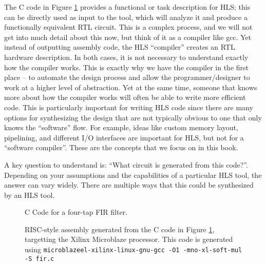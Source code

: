 The C code in Figure \ref{fig:FIR} provides a functional or task description for HLS; this can be directly used as input to the \VHLS tool, which will analyze it and  produce a functionally equivalent RTL circuit. This is a complex process, and we will not get into much detail about this now, but think of it as a compiler like gcc. Yet instead of outputting assembly code, the HLS ``compiler'' creates an RTL hardware description. In both cases, it is not necessary to understand exactly how the compiler works. This is exactly why we have the compiler in the first place -- to automate the design process and allow the programmer/designer to work at a higher level of abstraction. Yet at the same time, someone that knows more about how the compiler works will often be able to write more efficient code. This is particularly important for writing HLS code since there are many options for synthesizing the design that are not typically obvious to one that only knows the ``software'' flow. For example, ideas like custom memory layout, pipelining, and different I/O interfaces are important for HLS, but not for a ``software compiler''. These are the concepts that we focus on in this book.

A key question to understand is: ``What circuit is generated from this code?''.  Depending on your assumptions and the capabilities of a particular HLS tool, the answer can vary widely. There are multiple ways that this could be synthesized by an HLS tool. %

\begin{figure}
{

}
\caption{C Code for a four-tap FIR filter.
}\label{fig:FIR}
\end{figure}

\begin{figure}
{
\hbox{}\hbox{}
}
\caption{RISC-style assembly generated from the C code in Figure \ref{fig:FIR}, targetting the Xilinx Microblaze processor.  This code is generated using \texttt{microblazeel-xilinx-linux-gnu-gcc -O1 -mno-xl-soft-mul -S fir.c}}\label{fig:FIR_microblaze}
\end{figure}

